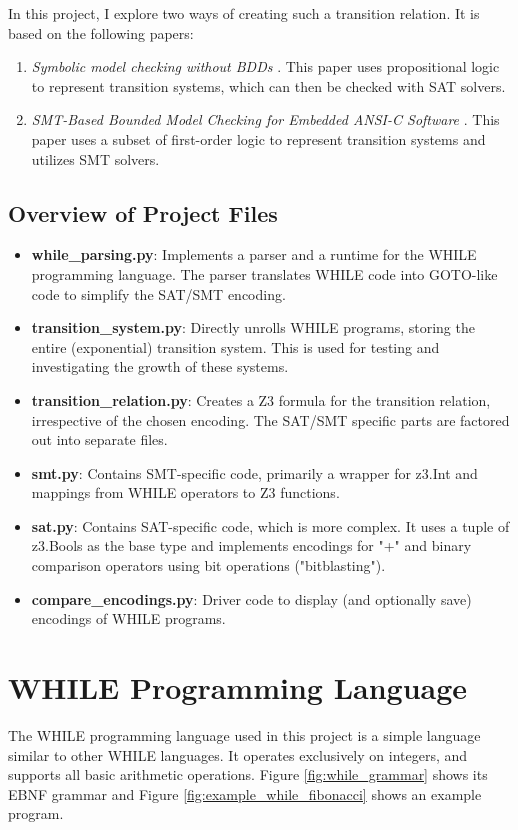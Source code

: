 \documentclass[sigconf,natbib=false]{acmart}
\begin{document}
In this project, I explore two ways of creating such a transition relation. It is based on the following papers:
\begin{enumerate}
\item \textit{Symbolic model checking without BDDs} \cite{biere1999symbolic}. This paper uses propositional logic to represent transition systems, which can then be checked with SAT solvers.
\item \textit{SMT-Based Bounded Model Checking for Embedded ANSI-C Software} \cite{cordeiro2011smt}. This paper uses a subset of first-order logic to represent transition systems and utilizes SMT solvers.
\end{enumerate}

\subsection{Overview of Project Files}

\begin{itemize}
\item \textbf{while\_parsing.py}: Implements a parser and a runtime for the WHILE programming language. The parser translates WHILE code into GOTO-like code to simplify the SAT/SMT encoding.
\item \textbf{transition\_system.py}: Directly unrolls WHILE programs, storing the entire (exponential) transition system. This is used for testing and investigating the growth of these systems.
\item \textbf{transition\_relation.py}: Creates a Z3 formula for the transition relation, irrespective of the chosen encoding. The SAT/SMT specific parts are factored out into separate files.
\item \textbf{smt.py}: Contains SMT-specific code, primarily a wrapper for z3.Int and mappings from WHILE operators to Z3 functions.
\item \textbf{sat.py}: Contains SAT-specific code, which is more complex. It uses a tuple of z3.Bools as the base type and implements encodings for "+" and binary comparison operators using bit operations ("bitblasting").
\item \textbf{compare\_encodings.py}: Driver code to display (and optionally save) encodings of WHILE programs.
\end{itemize}



\section{WHILE Programming Language}
The WHILE programming language used in this project is a simple language similar to other WHILE languages. It operates exclusively on integers, and supports all basic arithmetic operations. Figure \ref{fig:while_grammar} shows its EBNF grammar and Figure \ref{fig:example_while_fibonacci} shows an example program.
\end{document}
